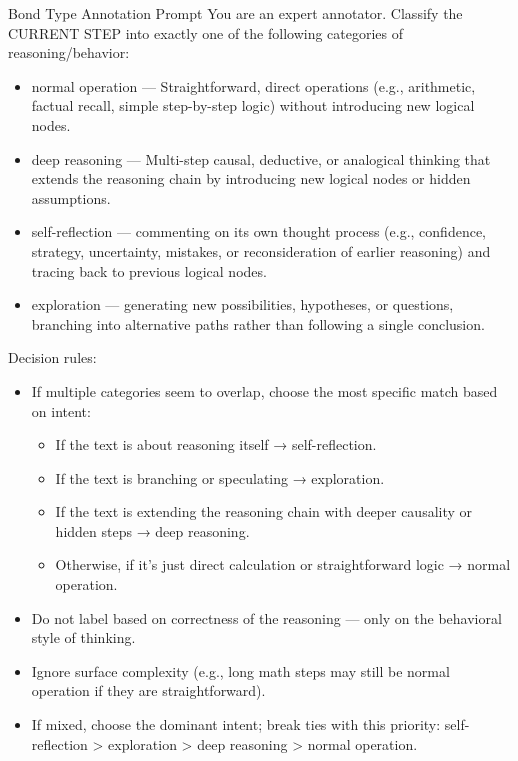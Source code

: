 \begin{PromptBox}{Bond Type Annotation Prompt}
You are an expert annotator. Classify the CURRENT STEP into exactly one of the following categories of reasoning/behavior:
\begin{itemize}[leftmargin=16pt, itemsep=0pt, topsep=0pt]
    \item normal operation — Straightforward, direct operations (e.g., arithmetic, factual recall, simple step-by-step logic) without introducing new logical nodes.
    \item deep reasoning — Multi-step causal, deductive, or analogical thinking that extends the reasoning chain by introducing new logical nodes or hidden assumptions.
    \item self-reflection — commenting on its own thought process (e.g., confidence, strategy, uncertainty, mistakes, or reconsideration of earlier reasoning) and tracing back to previous logical nodes.
    \item exploration — generating new possibilities, hypotheses, or questions, branching into alternative paths rather than following a single conclusion.\\
\end{itemize}

    
Decision rules:
\begin{itemize}[leftmargin=16pt, itemsep=0pt, topsep=0pt]
    \item[(1)] If multiple categories seem to overlap, choose the most specific match based on intent:
    \begin{itemize}[leftmargin=16pt, itemsep=0pt, topsep=0pt]
        \item If the text is about reasoning itself → self-reflection.
        \item If the text is branching or speculating → exploration.
        \item If the text is extending the reasoning chain with deeper causality or hidden steps → deep reasoning.
        \item Otherwise, if it's just direct calculation or straightforward logic → normal operation.
    \end{itemize}
    \item[(2)] Do not label based on correctness of the reasoning — only on the behavioral style of thinking.
    \item[(3)] Ignore surface complexity (e.g., long math steps may still be normal operation if they are straightforward).
    \item[(4)] If mixed, choose the dominant intent; break ties with this priority: self-reflection > exploration > deep reasoning > normal operation.\\
\end{itemize}


\end{PromptBox}
